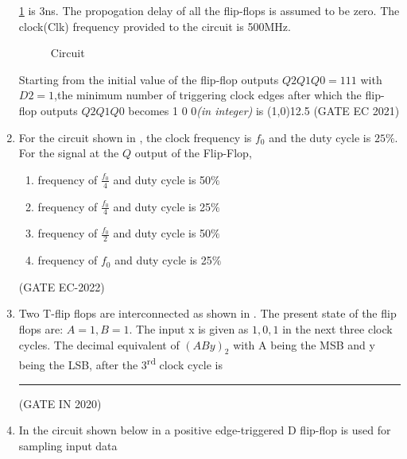 \begin{enumerate}[label=\arabic*.,ref=\theenumi]
\label{prob:2021-gate-ec-46}
\ref{fig:2021-gate-ec-46}
is 3ns. The propogation delay of all the flip-flops is assumed to be zero. The clock(Clk) frequency provided to the circuit is 500MHz.
\begin{figure}[H]
\begin{center}
\resizebox{0.5\columnwidth}{!}{

}
\end{center}
	\caption{Circuit}
\label{fig:2021-gate-ec-46}
\end{figure}
%
Starting from the initial value of the flip-flop outputs $Q2Q1Q0 =111$ with $D2=1$,the minimum number of triggering clock edges after which the flip-flop outputs $Q2Q1Q0$ becomes 1 0 0\emph{(in integer)} is \line(1,0){12.5}
\hfill (GATE EC 2021)
\fi
\item 
\label{prob:2022-gate-ec-43}
	 For the circuit shown in  
,
		the clock frequency is $f_0$ and the duty cycle is $25 \%$. For the signal at the $Q$ output of the Flip-Flop,
\begin{enumerate}
	\item frequency of $\frac{f_0}{4}$ and duty cycle is 50$\%$
	\item frequency of $\frac{f_0}{4}$ and duty cycle is 25$\%$
	\item frequency of $\frac{f_0}{2}$ and duty cycle is 50$\%$
	\item frequency of $f_0$ and duty cycle is 25$\%$ \\
\end{enumerate}
\begin{figure}[H]
	\centering
    \resizebox{0.75\columnwidth}{!}{%

	}
	\caption{}
\label{fig:2022-gate-ec-43}
\end{figure}
\hfill 	(GATE EC-2022)
\item 
 Two T-flip flops are interconnected as shown in . The present state of the flip flops are: $A = 1, B = 1$. The input x is given as $1, 0, 1$ in the next three clock cycles. The decimal equivalent of $(ABy)_{2}$ with A being the MSB and y being the LSB, after the 3\textsuperscript{rd} clock cycle is \rule{12mm}{0.4pt}
%
	\begin{figure}[H]
    \centering
    \resizebox{0.75\columnwidth}{!}{%
		
		}
		\caption{}
		\label{fig:tff1}
	\end{figure}
		\hfill (GATE IN 2020)
%
\item In the circuit shown below in  a positive edge-triggered D flip-flop is used for sampling input data

\end{enumerate}
